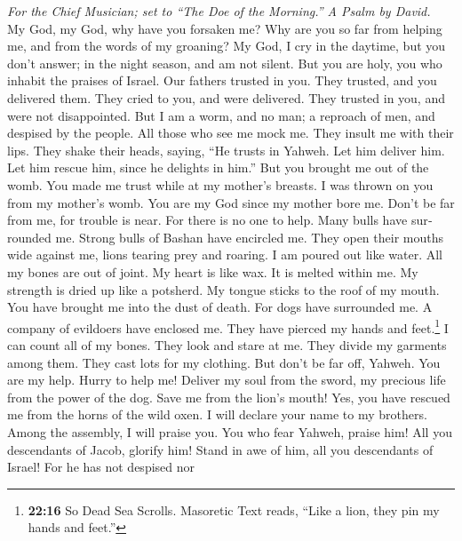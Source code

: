 \begin{paracol}{2}
\begin{otherlanguage}{english}
\emph{For the Chief Musician; set to ``The Doe of the Morning.'' A Psalm
by David.}\\
 My God, my God, why have you forsaken me? Why are you so
far from helping me, and from the words of my groaning? 
My God, I cry in the daytime, but you don't answer; in the night season,
and am not silent.  But you are holy, you who inhabit the
praises of Israel.  Our fathers trusted in you. They
trusted, and you delivered them.  They cried to you, and
were delivered. They trusted in you, and were not disappointed.
 But I am a worm, and no man; a reproach of men, and
despised by the people.  All those who see me mock me.
They insult me with their lips. They shake their heads, saying,
 ``He trusts in Yahweh. Let him deliver him. Let him
rescue him, since he delights in him.''  But you brought
me out of the womb. You made me trust while at my mother's breasts.
 I was thrown on you from my mother's womb. You are my
God since my mother bore me.  Don't be far from me, for
trouble is near. For there is no one to help.  Many bulls
have surrounded me. Strong bulls of Bashan have encircled me.
 They open their mouths wide against me, lions tearing
prey and roaring.  I am poured out like water. All my
bones are out of joint. My heart is like wax. It is melted within me.
 My strength is dried up like a potsherd. My tongue
sticks to the roof of my mouth. You have brought me into the dust of
death.  For dogs have surrounded me. A company of
evildoers have enclosed me. They have pierced my hands and
feet.\footnote{\textbf{22:16} So Dead Sea Scrolls. Masoretic Text reads,
  ``Like a lion, they pin my hands and feet.''}  I can
count all of my bones. They look and stare at me.  They
divide my garments among them. They cast lots for my clothing.
 But don't be far off, Yahweh. You are my help. Hurry to
help me!  Deliver my soul from the sword, my precious
life from the power of the dog.  Save me from the lion's
mouth! Yes, you have rescued me from the horns of the wild oxen.
 I will declare your name to my brothers. Among the
assembly, I will praise you.  You who fear Yahweh, praise
him! All you descendants of Jacob, glorify him! Stand in awe of him, all
you descendants of Israel!  For he has not despised nor

\end{otherlanguage}
\end{paracol}
